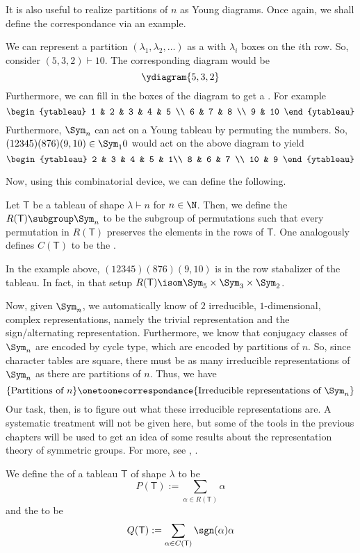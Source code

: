 \documentclass[11pt,leqno,oneside]{amsbook}
\newcommand{\partitionof}{\vdash}
\newcommand{\T}{\mathsf{T}}
\numberwithin{thm}{section}
\begin{document}
It is also useful to realize partitions of \(n\) as Young
diagrams. Once again, we shall define the correspondance via an
example.
\begin{example}
  We can represent a partition \((\lambda_1, \lambda_2, \ldots)\) as a
   with \(\lambda_i\) boxes on the \(i\)th row. So,
  consider \((5,3,2) \partitionof 10\). The corresponding diagram
  would be \[
    \ydiagram{5,3,2}
  \]
  Furthermore, we can fill in the boxes of the diagram to get a . For example \[ 
    \begin{ytableau}
      1 & 2 & 3 & 4 & 5 \\
      6 & 7 & 8 \\
      9 & 10
    \end{ytableau}
  \]
  Furthermore, \(\Sym_n\) can act on a Young tableau by permuting the
  numbers. So, \((12345)(876)(9,10) \in \Sym_10\) would act on the
  above diagram to yield \[
    \begin{ytableau}
      2 & 3 & 4 & 5 & 1\\
      8 & 6 & 7 \\
      10 & 9
    \end{ytableau}
  \]
\end{example}
Now, using this combinatorial device, we can define the following.
\begin{defn}
  Let \(\T\) be a tableau of shape \(\lambda \partitionof n\) for \(n
  \in \N\). Then, we define the 
  \(R(\T) \subgroup \Sym_n\) to be the subgroup of
  permutations such that
  every permutation in \(R(\T)\) preserves the elements in
  the rows of \(\T\). One analogously defines \(C(\T)\) to be the
  .
\end{defn}
\begin{example}
  In the example above, \((12345)(876)(9,10)\) is in the row
  stabalizer of the tableau. In fact, in that setup \(R(\T) \isom \Sym_5 \times
  \Sym_3 \times \Sym_2\). 
\end{example}
Now, given \(\Sym_n\), we automatically know of \(2\) irreducible,
\(1\)-dimensional, complex representations, namely the trivial
representation 
and the sign/alternating representation. Furthermore, we know that
conjugacy classes of \(\Sym_n\) are encoded by cycle type, which are
encoded by partitions of \(n\). So, since character tables are square,
there must be as many irreducible representations of \(\Sym_n\) as
there are partitions of \(n\). Thus, we have \[
  \{\text{Partitions of }n\} \onetoonecorrespondance
  \{\text{Irreducible representations of }\Sym_n\}
\]
Our task, then, is to figure out what these irreducible
representations are. A systematic treatment will not be given here,
but some of the tools in the previous chapters will be used to get an
idea of some results about the representation theory of symmetric
groups. For more, see \cite{james}, \cite{fulton}.
\begin{defn}
  We define the  of a tableau \(\T\) of shape
  \(\lambda\) to be \[
    P(\T) := \sum_{\alpha \in R(\T)} \alpha
  \]
  and the  to be \[
    Q(\T) := \sum_{\alpha \in C(\T)} \sgn(\alpha) \alpha
  \]
\end{defn}
\end{document}
